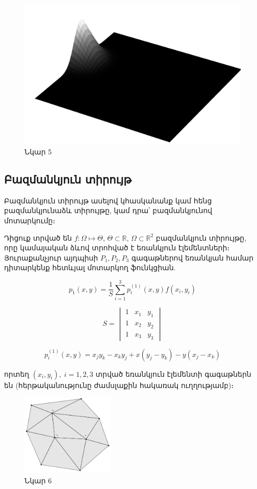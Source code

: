 \documentclass[fleqn, bachelor,subf,12pt,notitlepage]{disser}
\begin{document}
\begin{figure}[h!]
\centering
\includegraphics[width=1.0\textwidth]{images/two_dimensional_basis_1}
\captionsetup{labelformat=empty}
\caption{\hfill Նկար 5}
\end{figure}

\newpage
\subsection*{Բազմանկյուն տիրույթ}

Բազմանկյուն տիրույթ ասելով կհասկանանք կամ հենց բազմանկյունաձև տիրույթը, կամ դրա՝ բազմանկյունով մոտարկումը։ 

Դիցուք տրված են $f:\Omega\mapsto \Theta$,  $\Theta \subset \mathbb{R}$, $\Omega \subset \mathbb{R}^{2} $ բազմանկյուն տիրույթը, որը կամայական ձևով տրոհված է եռանկյուն էլեմենտների։ Յուրաքանչյուր այդպիսի $P_{1}, P_{2}, P_{3}$ գագաթներով եռանկյան համար դիտարկենք հետևյալ մոտարկող ֆունկցիան.

$$p_{1}(x, y) = \dfrac{1}{S}\sum_{i=1}^{3} p^{(1)}_{i}(x,y)f(x_{i}, y_{i})$$

$$S = \begin{vmatrix}
     1 & x_1 & y_1\\ 
     1 & x_2 & y_2\\
     1 & x_3 & y_3 
\end{vmatrix}$$

$$p^{(1)}_{i}(x,y) = x_{j}y_{k}-x_{k}y_{j}+x(y_{j}-y_{k})-y(x_{j}-x_{k})$$

\noindent որտեղ $(x_{i}, y_{i}), \; i=1, 2, 3$ տրված եռանկյուն էլեմենտի գագաթներն են (հերթականությունը ժամսլաքին հակառակ ուղղությամբ)։

\begin{figure}[h!]
\centering
\includegraphics[width=0.4\textwidth]{images/two_var_triangular}
\captionsetup{labelformat=empty}
\caption{\hfill Նկար 6}
\end{figure}
\end{document}
